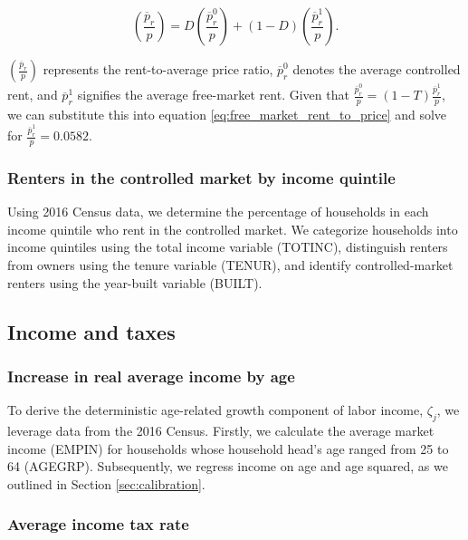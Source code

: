 \begin{equation}\label{eq:free_market_rent_to_price}
    {\left(\frac{\overline{p}_{r}}{p}\right)}=D \left(\frac{\overline{p}^{0}_{r}}{p}\right)+(1-D) \left(\frac{\overline{p}^{1}_{r}}{p}\right).
\end{equation}

\noindent $\left(\frac{\overline{p}_{r}}{p}\right)$ represents the rent-to-average price ratio, $\overline{p}^{0}_{r}$ denotes the average controlled rent, and $\overline{p}^{1}_{r}$ signifies the average free-market rent. Given that $\frac{\overline{p}^{0}_{r}}{p}=(1-T)\frac{\overline{p}^{1}_{r}}{p}$, we can substitute this into equation \eqref{eq:free_market_rent_to_price} and solve for $\frac{\overline{p}^{1}_{r}}{p}=0.0582$.

\subsubsection{Renters in the controlled market by income quintile}

Using 2016 Census data, we determine the percentage of households in each income quintile who rent in the controlled market. We categorize households into income quintiles using the total income variable (TOTINC), distinguish renters from owners using the tenure variable (TENUR), and identify controlled-market renters using the year-built variable (BUILT).

\subsection{Income and taxes}

\subsubsection{Increase in real average income by age}

To derive the deterministic age-related growth component of labor income, $\zeta_{j}$, we leverage data from the 2016 Census. Firstly, we calculate the average market income (EMPIN) for households whose household head's age ranged from 25 to 64 (AGEGRP). Subsequently, we regress income on age and age squared, as we outlined in Section \ref{sec:calibration}.

\subsubsection{Average income tax rate}

